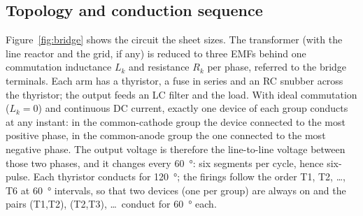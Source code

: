 \documentclass[10pt,a4paper]{scrartcl}
\newcommand{\Lk}{L_{k}}
\newcommand{\Rk}{R_{k}}
\begin{document}
\subsection{Topology and conduction sequence}
Figure~\ref{fig:bridge} shows the circuit the sheet sizes. The transformer (with the line reactor and the grid, if any) is reduced to three EMFs behind one commutation inductance $\Lk$ and resistance $\Rk$ per phase, referred to the bridge terminals. Each arm has a thyristor, a fuse in series and an RC snubber across the thyristor; the output feeds an LC filter and the load. With ideal commutation ($\Lk = 0$) and continuous DC current, exactly one device of each group conducts at any instant: in the common-cathode group the device connected to the most positive phase, in the common-anode group the one connected to the most negative phase. The output voltage is therefore the line-to-line voltage between those two phases, and it changes every \SI{60}{\degree}: six segments per cycle, hence six-pulse. Each thyristor conducts for \SI{120}{\degree}; the firings follow the order T1, T2, \ldots, T6 at \SI{60}{\degree} intervals, so that two devices (one per group) are always on and the pairs (T1,T2), (T2,T3), \ldots\ conduct for \SI{60}{\degree} each.
\end{document}

